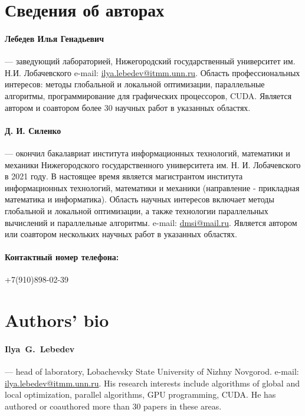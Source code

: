 \documentclass[12pt, a4paper, russian]{article}
\begin{document}
%
%
\renewcommand{\refname}{Список литературы}


\section*{Сведения об авторах}

\paragraph{Лебедев Илья Генадьевич} --- заведующий лабораторией, Нижегородский государственный университет им. Н.И. Лобачевского  e-mail: \url{ilya.lebedev@itmm.unn.ru}. Область профессиональных интересов: методы глобальной и локальной оптимизации, параллельные алгоритмы, программирование для графических процессоров, CUDA. Является автором и соавтором более 30 научных работ в указанных областях.

\paragraph{Д. И. Силенко} --- окончил бакалавриат института информационных технологий, математики и механики Нижегородского государственного университета им. Н. И. Лобачевского в 2021 году. В настоящее время является магистрантом института информационных технологий, математики и механики (направление - прикладная математика и информатика). Область научных интересов включает методы глобальной и локальной оптимизации, а также технологии параллельных вычислений и параллельные алгоритмы. e-mail: \url{dmsi@mail.ru}. Является автором или соавтором нескольких научных работ в указанных областях.



\paragraph{Контактный номер телефона:}{+7(910)898-02-39}

\section*{Authors' bio}

\paragraph{Ilya~G.~Lebedev} --- head of laboratory, Lobachevsky State University of Nizhny Novgorod. e-mail: \url{ilya.lebedev@itmm.unn.ru}. His research interests include algorithms of global and local optimization, parallel algorithms, GPU programming, CUDA. He has authored or coauthored more than 30 papers in these areas.
\end{document}
